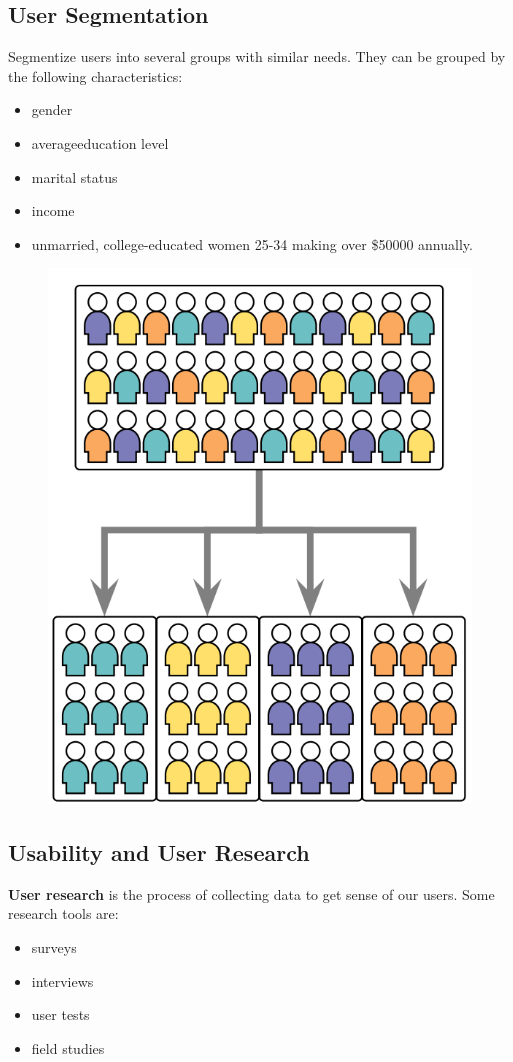 \subsection{User Segmentation}
Segmentize users into several groups with similar needs. 
They can be grouped by the following characteristics:
\begin{itemize}
    \item gender
    \item averageeducation level
    \item marital status
    \item income
    \item unmarried, college-educated women 25-34 making over \$50000 annually.
\end{itemize}
\begin{figure}
    \includegraphics[width=\linewidth]{images/pic3.png}
\end{figure}
\subsection{Usability and User Research}
\textbf{User research} is the process of collecting data to get sense of our users. Some research tools are:
\begin{itemize}
    \item surveys
    \item interviews
    \item user tests
    \item field studies
\end{itemize}
